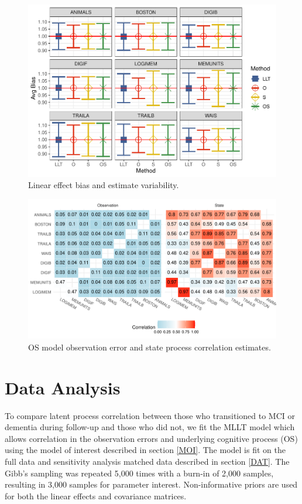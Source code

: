 \documentclass[
]{article}
\begin{document}
\begin{figure}
\centering
\includegraphics{Master_files/figure-latex/unnamed-chunk-34-1.pdf}
\caption{\label{fig:unnamed-chunk-34}Linear effect bias and estimate variability.}
\end{figure}

\begin{figure}
\centering
\includegraphics{Master_files/figure-latex/unnamed-chunk-35-1.pdf}
\caption{\label{fig:unnamed-chunk-35}OS model observation error and state process correlation estimates.}
\end{figure}

\hypertarget{data-analysis}{%
\section{Data Analysis}\label{data-analysis}}

To compare latent process correlation between those who transitioned to MCI or dementia during follow-up and those who did not, we fit the MLLT model which allows correlation in the observation errors and underlying cognitive process (OS) using the model of interest described in section \ref{MOI}. The model is fit on the full data and sensitivity analysis matched data described in section \ref{DAT}. The Gibb's sampling was repeated 5,000 times with a burn-in of 2,000 samples, resulting in 3,000 samples for parameter interest. Non-informative priors are used for both the linear effects and covariance matrices.
\end{document}
